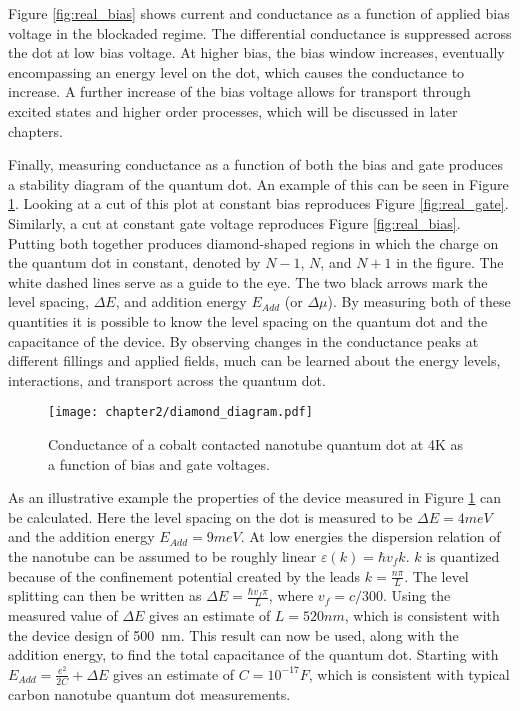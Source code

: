 Figure \ref{fig:real_bias} shows current and conductance as a function of applied bias voltage in the blockaded regime. The differential conductance is suppressed across the dot at low bias voltage. At higher bias, the bias window increases, eventually encompassing an energy level on the dot, which causes the conductance to increase. A further increase of the bias voltage allows for transport through excited states and higher order processes, which will be discussed in later chapters.

Finally, measuring conductance as a function of both the bias and gate produces a stability diagram of the quantum dot. An example of this can be seen in Figure \ref{fig:coulomb_diamonds}. Looking at a cut of this plot at constant bias reproduces Figure \ref{fig:real_gate}. Similarly, a cut at constant gate voltage reproduces Figure \ref{fig:real_bias}. Putting both together produces diamond-shaped regions in which the charge on the quantum dot in constant, denoted by $N-1$, $N$, and $N+1$ in the figure. The white dashed lines serve as a guide to the eye. The two black arrows mark the level spacing, $\Delta E$, and addition energy $E_{Add}$ (or $\Delta \mu$). By measuring both of these quantities it is possible to know the level spacing on the quantum dot and the capacitance of the device. By observing changes in the conductance peaks at different fillings and applied fields, much can be learned about the energy levels, interactions, and transport across the quantum dot.

\begin{figure}
    \centering
    \texttt{[image: chapter2/diamond\_diagram.pdf]}
    \caption{Conductance of a cobalt contacted nanotube quantum dot at 4K as a function of bias and gate voltages.}
    \label{fig:coulomb_diamonds}
\end{figure}

As an illustrative example the properties of the device measured in Figure \ref{fig:coulomb_diamonds} can be calculated. Here the level spacing on the dot is measured to be $\Delta E = 4meV$ and the addition energy $E_{Add} = 9meV$. At low energies the dispersion relation of the nanotube can be assumed to be roughly linear $\varepsilon(k) = \hbar v_f k$. $k$ is quantized because of the confinement potential created by the leads $k = \frac{n\pi}{L}$. The level splitting can then be written as $\Delta E = \frac{\hbar v_f \pi}{L}$, where $v_f=c/300$. Using the measured value of $\Delta E$ gives an estimate of $L = 520nm$, which is consistent with the device design of \SI{500}{\nano\meter}. This result can now be used, along with the addition energy, to find the total capacitance of the quantum dot. Starting with $E_{Add} = \frac{e^2}{2C} + \Delta E$ gives an estimate of $C=10^{-17}F$, which is consistent with typical carbon nanotube quantum dot measurements.